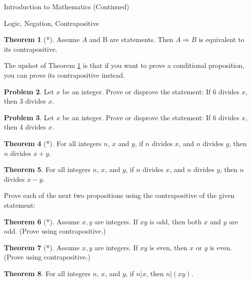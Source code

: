 \documentclass[11pt]{article}
\theoremstyle{definition}
\newtheorem{theorem}{Theorem}[section]
\newtheorem{problem}[theorem]{Problem}
\begin{document}
\begin{section}{Introduction to Mathematics (Continued)}
\begin{subsection}{Logic, Negation, Contrapositive}
\begin{theorem}[*]\label{thm:contrapos}
Assume $A$ and B are statements.  Then $A \Rightarrow B$ is equivalent to its contrapositive.
\end{theorem}

The upshot of Theorem \ref{thm:contrapos} is that if you want to prove a conditional proposition, you can prove its contrapositive instead.

\begin{problem} Let $x$ be an integer.  Prove or disprove the statement: If 6 divides $x$, then 3 divides $x$.\end{problem}

\begin{problem} Let $x$ be an integer.  Prove or disprove the statement: If 6 divides $x$, then 4 divides $x$.\end{problem}

\begin{theorem}[*] For all integers $n$, $x$ and $y$, if $n$ divides $x$, and $n$ divides $y$, then $n$ divides $x+y$.\end{theorem}

\begin{theorem} For all integers $n$, $x$, and $y$, if $n$ divides $x$, and $n$ divides $y$, then $n$ divides $x-y$.\end{theorem}

\noindent Prove each of the next two propositions using the contrapositive of the given statement: 

\begin{theorem}[*]
Assume $x,y$ are integers.  If $xy$ is odd, then both $x$ and $y$ are odd. (Prove using contrapositive.)
\end{theorem}

\begin{theorem}[*]
Assume $x,y$ are integers.  If $xy$ is even, then $x$ or $y$ is even.  (Prove using contrapositive.)
\end{theorem}

\begin{theorem} For all integers $n$, $x$, and $y$, if $n|x$, then $n|(xy)$.\end{theorem}

\end{subsection}

\end{section}
\end{document}
